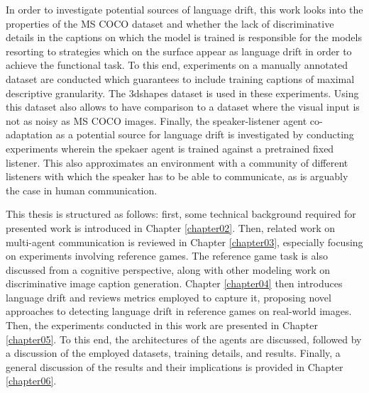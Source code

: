 In order to investigate potential sources of language drift, this work looks into the properties of the MS COCO dataset and whether the lack of discriminative details in the captions on which the model is trained is responsible for the models resorting to strategies which on the surface appear as language drift in order to achieve the functional task. To this end, experiments on a manually annotated dataset are conducted which guarantees to include training captions of maximal descriptive granularity. The 3dshapes dataset is used in these experiments.  Using this dataset also allows to have comparison to a dataset where the visual input is not as noisy as MS COCO images. Finally, the speaker-listener agent co-adaptation as a potential source for language drift is investigated by conducting experiments wherein the spekaer agent is trained against a pretrained fixed listener. This also approximates an environment with a community of different listeners with which the speaker has to be able to communicate, as is arguably the case in human communication. 


This thesis is structured as follows: first, some technical background required for presented work is introduced in Chapter \ref{chapter02}. Then, related work on multi-agent communication is reviewed in Chapter \ref{chapter03}, especially focusing on experiments involving reference games. The reference game task is also discussed from a cognitive perspective, along with other modeling work on discriminative image caption generation. Chapter \ref{chapter04} then introduces language drift and reviews metrics employed to capture it, proposing novel approaches to detecting language drift in reference games on real-world images. Then, the experiments conducted in this work are presented in Chapter \ref{chapter05}. To this end, the architectures of the agents are discussed, followed by a discussion of the employed datasets, training details, and results. Finally, a general discussion of the results and their implications is provided in Chapter \ref{chapter06}. %


